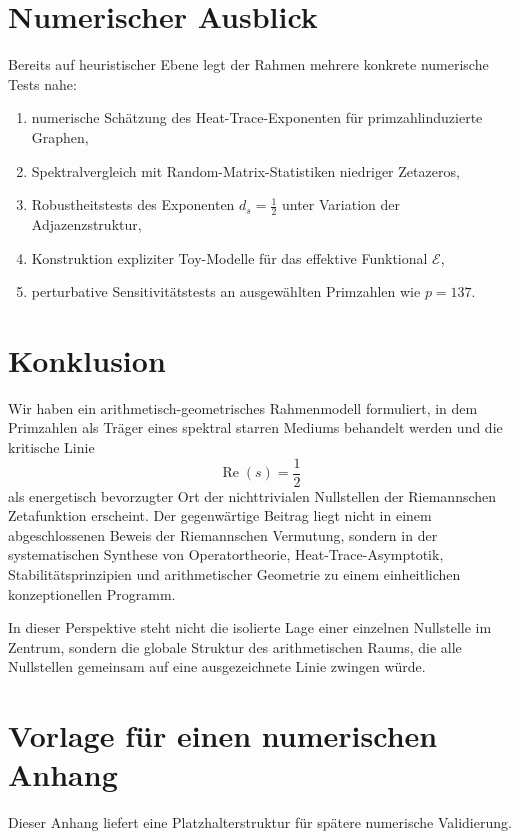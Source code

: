 \documentclass[11pt,a4paper]{amsart}
\theoremstyle{plain}
\theoremstyle{definition}
\theoremstyle{remark}
\newcommand{\RePart}{\operatorname{Re}}
\newcommand{\Eeff}{\mathcal{E}}
\begin{document}
	\section{Numerischer Ausblick}
	
	Bereits auf heuristischer Ebene legt der Rahmen mehrere konkrete numerische Tests nahe:
	\begin{enumerate}[label=\arabic*.]
		\item numerische Schätzung des Heat-Trace-Exponenten für primzahlinduzierte Graphen,
		\item Spektralvergleich mit Random-Matrix-Statistiken niedriger Zetazeros,
		\item Robustheitstests des Exponenten \(d_s=\tfrac12\) unter Variation der Adjazenzstruktur,
		\item Konstruktion expliziter Toy-Modelle für das effektive Funktional \(\Eeff\),
		\item perturbative Sensitivitätstests an ausgewählten Primzahlen wie \(p=137\).
	\end{enumerate}
	
	\section{Konklusion}
	
	Wir haben ein arithmetisch-geometrisches Rahmenmodell formuliert, in dem Primzahlen als Träger eines spektral starren Mediums behandelt werden und die kritische Linie
	\[
	\RePart(s)=\frac12
	\]
	als energetisch bevorzugter Ort der nichttrivialen Nullstellen der Riemannschen Zetafunktion erscheint. Der gegenwärtige Beitrag liegt nicht in einem abgeschlossenen Beweis der Riemannschen Vermutung, sondern in der systematischen Synthese von Operatortheorie, Heat-Trace-Asymptotik, Stabilitätsprinzipien und arithmetischer Geometrie zu einem einheitlichen konzeptionellen Programm.
	
	In dieser Perspektive steht nicht die isolierte Lage einer einzelnen Nullstelle im Zentrum, sondern die globale Struktur des arithmetischen Raums, die alle Nullstellen gemeinsam auf eine ausgezeichnete Linie zwingen würde.
	
	\appendix
	
	\section{Vorlage für einen numerischen Anhang}
	
	Dieser Anhang liefert eine Platzhalterstruktur für spätere numerische Validierung.
	
\end{document}

